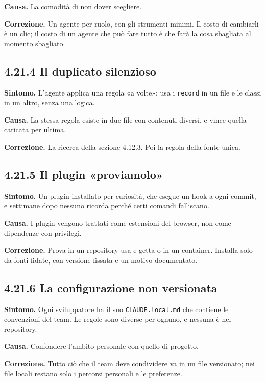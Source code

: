 \documentclass[
  italian,
  10pt,
]{book}
\begin{document}
\textbf{Causa.} La comodità di non dover scegliere.

\textbf{Correzione.} Un agente per ruolo, con gli strumenti minimi. Il
costo di cambiarli è un clic; il costo di un agente che può fare tutto è
che farà la cosa sbagliata al momento sbagliato.

\subsection{4.21.4 Il duplicato
silenzioso}\label{il-duplicato-silenzioso}

\textbf{Sintomo.} L'agente applica una regola «a volte»: usa i
\texttt{record} in un file e le classi in un altro, senza una logica.

\textbf{Causa.} La stessa regola esiste in due file con contenuti
diversi, e vince quella caricata per ultima.

\textbf{Correzione.} La ricerca della sezione 4.12.3. Poi la regola
della fonte unica.

\subsection{4.21.5 Il plugin «proviamolo»}\label{il-plugin-proviamolo}

\textbf{Sintomo.} Un plugin installato per curiosità, che esegue un hook
a ogni commit, e settimane dopo nessuno ricorda perché certi comandi
falliscano.

\textbf{Causa.} I plugin vengono trattati come estensioni del browser,
non come dipendenze con privilegi.

\textbf{Correzione.} Prova in un repository usa-e-getta o in un
container. Installa solo da fonti fidate, con versione fissata e un
motivo documentato.

\subsection{4.21.6 La configurazione non
versionata}\label{la-configurazione-non-versionata}

\textbf{Sintomo.} Ogni sviluppatore ha il suo \texttt{CLAUDE.local.md}
che contiene le convenzioni del team. Le regole sono diverse per ognuno,
e nessuna è nel repository.

\textbf{Causa.} Confondere l'ambito personale con quello di progetto.

\textbf{Correzione.} Tutto ciò che il team deve condividere va in un
file versionato; nei file locali restano solo i percorsi personali e le
preferenze.
\end{document}

